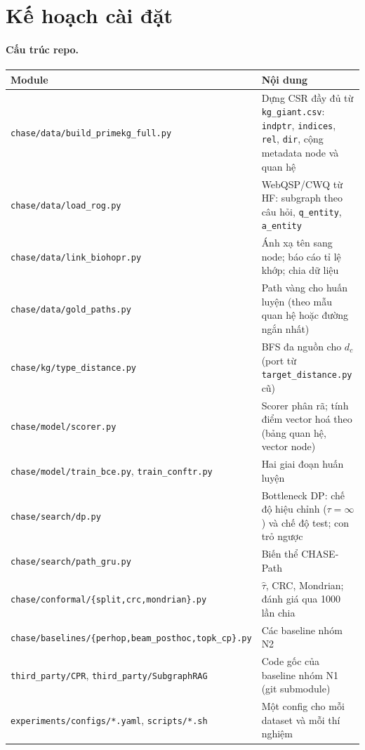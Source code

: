 \documentclass[11pt,a4paper]{article}
\theoremstyle{remark}
\newcommand{\tauhat}{\hat{\tau}}
\newcommand{\method}{\textsc{CHASE}}
\begin{document}
\section{Kế hoạch cài đặt}\label{sec:impl}

\paragraph{Cấu trúc repo.}
\begin{center}
\small
\begin{tabularx}{\linewidth}{>{\raggedright\arraybackslash}p{5.2cm} >{\raggedright\arraybackslash}X}
\toprule
Module & Nội dung \\
\midrule
\texttt{chase/data/build\_primekg\_full.py} & Dựng CSR đầy đủ từ \texttt{kg\_giant.csv}: \texttt{indptr}, \texttt{indices}, \texttt{rel}, \texttt{dir}, cộng metadata node và quan hệ \\
\texttt{chase/data/load\_rog.py} & WebQSP/CWQ từ HF: subgraph theo câu hỏi, \texttt{q\_entity}, \texttt{a\_entity} \\
\texttt{chase/data/link\_biohopr.py} & Ánh xạ tên sang node; báo cáo tỉ lệ khớp; chia dữ liệu \\\texttt{chase/data/gold\_paths.py} & Path vàng cho huấn luyện (theo mẫu quan hệ hoặc đường ngắn nhất) \\
\texttt{chase/kg/type\_distance.py} & BFS đa nguồn cho $d_c$ (port từ \texttt{target\_distance.py} cũ) \\
\texttt{chase/model/scorer.py} & Scorer phân rã; tính điểm vector hoá theo (bảng quan hệ, vector node) \\
\texttt{chase/model/train\_bce.py}, \texttt{train\_conftr.py} & Hai giai đoạn huấn luyện \\
\texttt{chase/search/dp.py} & Bottleneck DP: chế độ hiệu chỉnh ($\tau=\infty$) và chế độ test; con trỏ ngược \\
\texttt{chase/search/path\_gru.py} & Biến thể \method-Path \\
\texttt{chase/conformal/\{split,crc,mondrian\}.py} & $\tauhat$, CRC, Mondrian; đánh giá qua 1000 lần chia \\
\texttt{chase/baselines/\{perhop,beam\_posthoc,topk\_cp\}.py} & Các baseline nhóm N2 \\
\texttt{third\_party/CPR}, \texttt{third\_party/SubgraphRAG} & Code gốc của baseline nhóm N1 (git submodule) \\
\texttt{experiments/configs/*.yaml}, \texttt{scripts/*.sh} & Một config cho mỗi dataset và mỗi thí nghiệm \\
\bottomrule
\end{tabularx}
\end{center}
\end{document}
